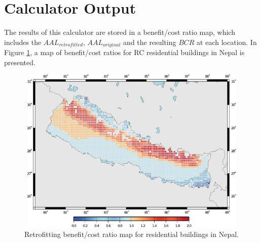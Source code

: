 \section{Calculator Output}
The results of this calculator are stored in a benefit/cost ratio map, which includes the $AAL_{retrofitted}$, $AAL_{original}$ and the resulting $BCR$ at each location. In Figure \ref{fig:BCRMap}, a map of benefit/cost ratios for RC residential buildings in Nepal is presented.

\begin{figure}[ht]
\centering
\includegraphics[width=12cm,height=8cm]{./figures/risk/BenefitCostRatioMap.eps}
\caption{Retrofitting benefit/cost ratio map for residential buildings in Nepal.}
\label{fig:BCRMap}
\end{figure}